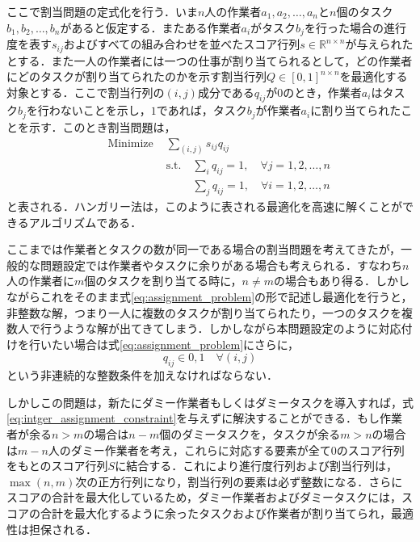     ここで割当問題の定式化を行う．いま$n$人の作業者$a_1, a_2, \dots, a_n$と$n$個のタスク$b_1, b_2, \dots, b_n$があると仮定する．またある作業者$a_i$がタスク$b_j$を行った場合の進行度を表す$s_{ij}$およびすべての組み合わせを並べたスコア行列$s \in \mathbb{R}^{n \times n}$が与えられたとする．また一人の作業者には一つの仕事が割り当てられるとして，どの作業者にどのタスクが割り当てられたのかを示す割当行列$Q \in [0, 1]^{n \times n}$を最適化する対象とする．ここで割当行列の$(i,j)$成分である$q_{ij}$が$0$のとき，作業者$a_i$はタスク$b_j$を行わないことを示し，$1$であれば，タスク$b_j$が作業者$a_i$に割り当てられたことを示す．このとき割当問題は，
    \begin{equation}
        \label{eq:assignment_problem}
        \begin{aligned}
            &&\text{Minimize } &\sum _{(i, j)} s_{ij} q_{ij}  
            \\ &&&\text{s.t.}\quad \sum_i q_{ij} = 1,\quad \forall j = 1, 2, \dots, n
            \\ &&&\phantom{\text{s.t.}}\quad \sum_j q_{ij} = 1,\quad \forall i = 1,2,\dots, n
        \end{aligned}
    \end{equation}
    と表される．ハンガリー法\cite{kuhn1955hungarian}は，このように表される最適化を高速に解くことができるアルゴリズムである．

    ここまでは作業者とタスクの数が同一である場合の割当問題を考えてきたが，一般的な問題設定では作業者やタスクに余りがある場合も考えられる．すなわち$n$人の作業者に$m$個のタスクを割り当てる時に，$n \neq m$の場合もあり得る．しかしながらこれをそのまま式\ref{eq:assignment_problem}の形で記述し最適化を行うと，非整数な解，つまり一人に複数のタスクが割り当てられたり，一つのタスクを複数人で行うような解が出てきてしまう．しかしながら本問題設定のように対応付けを行いたい場合は式\ref{eq:assignment_problem}にさらに，
    \begin{equation}
        \label{eq:intger_assignment_constraint}
        q_{ij} \in {0, 1} \quad \forall (i,j)
    \end{equation}
    という非連続的な整数条件を加えなければならない．

    しかしこの問題は，新たにダミー作業者もしくはダミータスクを導入すれば，式\ref{eq:intger_assignment_constraint}を与えずに解決することができる．もし作業者が余る$n > m$の場合は$n-m$個のダミータスクを，タスクが余る$m > n$の場合は$m-n$人のダミー作業者を考え，これらに対応する要素が全て$0$のスコア行列をもとのスコア行列$S$に結合する．これにより進行度行列および割当行列は，$\max(n, m)$次の正方行列になり，割当行列の要素は必ず整数になる．さらにスコアの合計を最大化しているため，ダミー作業者およびダミータスクには，スコアの合計を最大化するように余ったタスクおよび作業者が割り当てられ，最適性は担保される．

